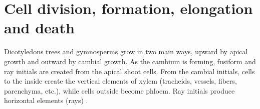\section{Cell division, formation, elongation and death}
Dicotyledons trees and gymnosperms grow in two main ways, upward by apical growth and
outward by cambial growth.  As the cambium is forming, fusiform and ray initials
are created from the apical shoot cells. From the cambial initials,
cells to the inside create the vertical elements of xylem (tracheids, vessels,
fibers, parenchyma, etc.), while cells outside become phloem. Ray
initials produce horizontal elements (rays) \cite{fromm2013cellular}.
